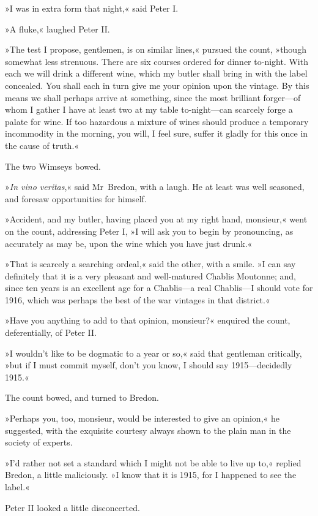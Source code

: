 »I was in extra form that night,« said Peter I.

»A fluke,« laughed Peter II.

»The test I propose, gentlemen, is on similar lines,« pursued the count, »though somewhat less strenuous. There are six courses ordered for dinner to-night. With each we will drink a different wine, which my butler shall bring in with the label concealed. You shall each in turn give me your opinion upon the vintage. By this means we shall perhaps arrive at something, since the most brilliant forger—of whom I gather I have at least two at my table to-night—can scarcely forge a palate for wine. If too hazardous a mixture of wines should produce a temporary incommodity in the morning, you will, I feel sure, suffer it gladly for this once in the cause of truth.«

The two Wimseys bowed.

»\textit{In vino veritas},« said Mr~Bredon, with a laugh. He at least was well seasoned, and foresaw opportunities for himself.

»Accident, and my butler, having placed you at my right hand, monsieur,« went on the count, addressing Peter I, »I will ask you to begin by pronouncing, as accurately as may be, upon the wine which you have just drunk.«

»That is scarcely a searching ordeal,« said the other, with a smile. »I can say definitely that it is a very pleasant and well-matured Chablis Moutonne; and, since ten years is an excellent age for a Chablis—a real Chablis—I should vote for 1916, which was perhaps the best of the war vintages in that district.«

»Have you anything to add to that opinion, monsieur?« enquired the count, deferentially, of Peter II.

»I wouldn't like to be dogmatic to a year or so,« said that gentleman critically, »but if I must commit myself, don't you know, I should say 1915—decidedly 1915.«

The count bowed, and turned to Bredon.

»Perhaps you, too, monsieur, would be interested to give an opinion,« he suggested, with the exquisite courtesy always shown to the plain man in the society of experts.

»I'd rather not set a standard which I might not be able to live up to,« replied Bredon, a little maliciously. »I know that it is 1915, for I happened to see the label.«

Peter II looked a little disconcerted.

